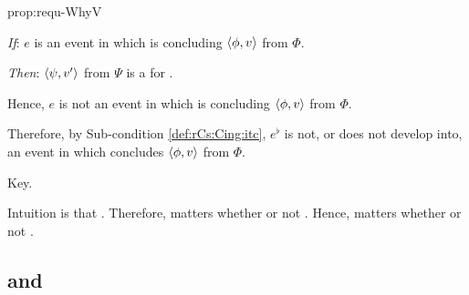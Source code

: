 \begin{note}
\begin{argument}{prop:requ-WhyV}
    \begin{itenum}
    \item[\emph{If}:]
      \(e\) is an event in which \vAgent{} is concluding \(\langle \phi, v \rangle\) from \(\Phi\).
    \item[\emph{Then}:]
      \(\langle \psi, v' \rangle\) from \(\Psi\) is a \fc{} for \vAgent{}.
    \end{itenum}

    \noindent%
    Hence, \(e\) is not an event in which \vAgent{} is concluding \(\langle \phi, v \rangle\) from \(\Phi\).

    Therefore, by Sub-condition \ref{def:rCs:Cing:itc}, \(e^{\flat}\) is not, or does not develop into, an event in which \vAgent{} concludes \(\langle \phi, v \rangle\) from \(\Phi\).
  \end{argument}
\end{note}

\begin{note}
  Key.

  Intuition is that \tC{}.
  Therefore, matters whether or not \fc{}.
  Hence, matters whether or not \ros{}.
\end{note}

\subsection{ and \issueConstraint{}}
\label{cha:binding:sec:requ-iC}

